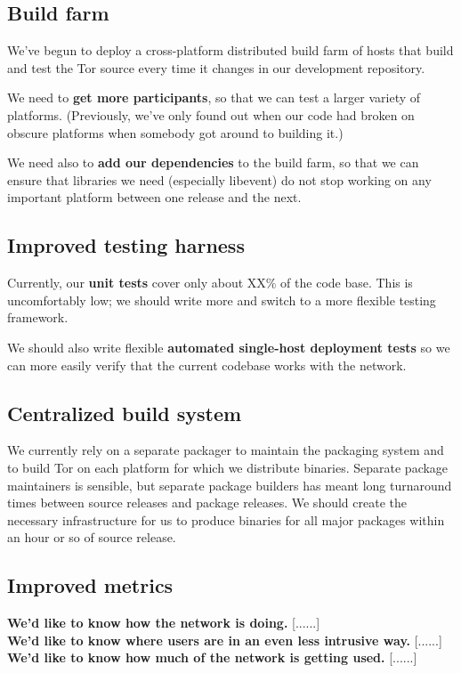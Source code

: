 \documentclass{article}
\newcommand{\tmp}[1]{{\bf #1} [......] \\}
\begin{document}
\subsection{Build farm}
We've begun to deploy a cross-platform distributed build farm of hosts
that build and test the Tor source every time it changes in our development
repository.

We need to {\bf get more participants}, so that we can test a larger variety
of platforms.  (Previously, we've only found out when our code had broken on
obscure platforms when somebody got around to building it.)

We need also to {\bf add our dependencies} to the build farm, so that we can
ensure that libraries we need (especially libevent) do not stop working on
any important platform between one release and the next.

\subsection{Improved testing harness}
Currently, our {\bf unit tests} cover only about XX\% of the code base.  This
is uncomfortably low; we should write more and switch to a more flexible
testing framework.

We should also write flexible {\bf automated single-host deployment tests} so
we can more easily verify that the current codebase works with the network.

\subsection{Centralized build system}
We currently rely on a separate packager to maintain the packaging system and
to build Tor on each platform for which we distribute binaries.  Separate
package maintainers is sensible, but separate package builders has meant
long turnaround times between source releases and package releases.  We
should create the necessary infrastructure for us to produce binaries for all
major packages within an hour or so of source release.

\subsection{Improved metrics}
\tmp{We'd like to know how the network is doing.}

\tmp{We'd like to know where users are in an even less intrusive way.}

\tmp{We'd like to know how much of the network is getting used.}
\end{document}
